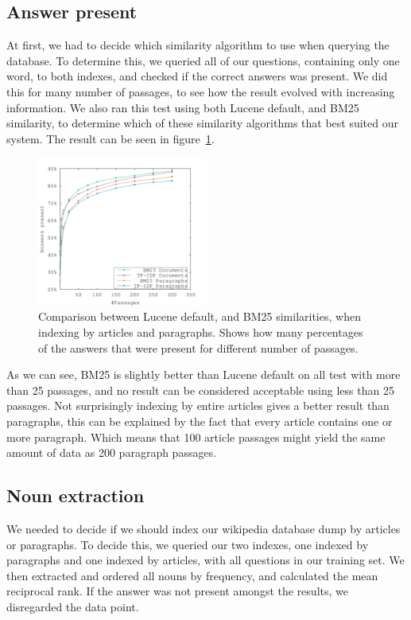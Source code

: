 \subsection{Answer present}
At first, we had to decide which similarity algorithm to use when querying the database. 
To determine this, we queried all of our questions, containing only one word, to both indexes, and checked if the correct answers was present.
We did this for many number of passages, to see how the result evolved with increasing information.
We also ran this test using both Lucene default, and BM25 similarity, to determine which of these similarity algorithms that best suited our system.
The result can be seen in figure~\ref{fig:bm25_tfdf}.

\begin{figure}[h!]
  \centering
  \includegraphics[width=0.5\textwidth]{figures/bm25_tfdf.pdf}
  \caption{Comparison between Lucene default, and BM25 similarities, when indexing by articles and paragraphs. 
  Shows how many percentages of the answers that were present for different number of passages.}
  \label{fig:bm25_tfdf}
\end{figure}

As we can see, BM25 is slightly better than Lucene default on all test with more than 25 passages, and no result can be 
considered acceptable using less than 25 passages.
Not surprisingly indexing by entire articles gives a better result than paragraphs, 
this can be explained by the fact that every article contains one or more paragraph. 
Which means that 100 article passages might yield the same amount of data as 200 paragraph passages.

\subsection{Noun extraction}

We needed to decide if we should index our wikipedia database dump by articles or paragraphs.
To decide this, we queried our two indexes, one indexed by paragraphs and
one indexed by articles, with all questions in our training set. We then extracted and 
ordered all nouns by frequency, and calculated the mean reciprocal rank.
If the answer was not present amongst the results, we disregarded the data point.

